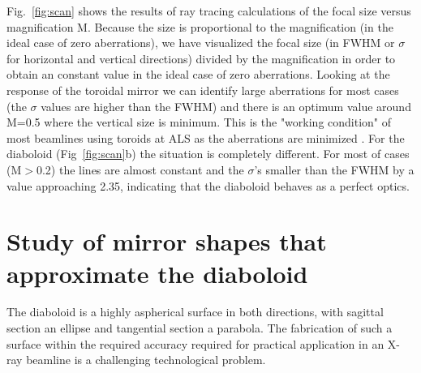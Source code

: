 \documentclass{iucr}              %
\begin{document}
Fig.~\ref{fig:scan} shows the results of ray tracing calculations of the focal size versus magnification M. Because the size is proportional to the magnification (in the ideal case of zero aberrations), we have visualized the focal size (in FWHM or $\sigma$ for horizontal and vertical directions) divided by the magnification in order to obtain an constant value in the ideal case of zero aberrations. Looking at the response of the toroidal mirror we can identify large aberrations for most cases (the $\sigma$ values are higher than the FWHM) and there is an optimum value around M=0.5 where the vertical size is minimum. This is the "working condition" of most beamlines using toroids at ALS as the aberrations are minimized \cite{MacDowell2004}. For the diaboloid (Fig~\ref{fig:scan}b) the situation is completely different. For most of cases (M$>$0.2) the lines are almost constant and the $\sigma$'s smaller than the FWHM by a value approaching 2.35, indicating that the diaboloid behaves as a perfect optics. 




\section{Study of mirror shapes that approximate the diaboloid}
\label{sec:approximatedShapes}

The diaboloid is a highly aspherical surface in both directions, with sagittal section an ellipse and tangential section a parabola. The fabrication of such a surface within the required accuracy required for practical application in an X-ray beamline is a challenging technological problem. 




\end{document}
